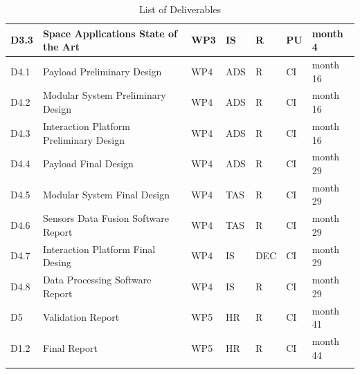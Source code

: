 \begin{longtable}[H]{p{1.8cm} >{\raggedright\arraybackslash}p{2.5cm} p{1.3cm} p{1.8cm} p{0.8cm} p{2.1cm} p{1.8cm}}
	D3.3 & Space Applications State of the Art & WP3 & IS & R  & PU  & month 4 \vspace{0.2cm} \\

	\midrule

 	D4.1 & Payload Preliminary Design  & WP4 & ADS & R & CI & month 16 \vspace{0.2cm} \\

 	\midrule

	D4.2 & Modular System Preliminary Design & WP4 & ADS & R & CI & month 16 \vspace{0.2cm} \\
	
	\midrule
	
	D4.3 & Interaction Platform Preliminary Design  & WP4 & ADS & R & CI & month 16 \vspace{0.2cm} \\

	\midrule

 	D4.4 & Payload Final Design & WP4 & ADS & R & CI & month 29  \vspace{0.2cm} \\

 	\midrule

	D4.5 & Modular System  Final Design & WP4 & TAS & R & CI & month 29  \vspace{0.2cm} \\
	
	\midrule
	
	D4.6 & Sensors Data Fusion Software Report  & WP4 & TAS & R & CI & month 29  \vspace{0.2cm} \\

	\midrule

 	D4.7 & Interaction Platform Final Desing  & WP4 & IS & DEC & CI & month 29 \vspace{0.2cm} \\

 	\midrule

	D4.8 & Data Processing Software Report & WP4 & IS & R & CI & month 29  \vspace{0.2cm} \\
	
	\midrule
	
	D5 & Validation Report & WP5 & HR & R & CI & month 41  \vspace{0.2cm} \\

	\midrule

 	D1.2 & Final Report & WP5 & HR & R & CI & month 44 \vspace{0.2cm} \\
	
	\bottomrule[2pt]
	
	\caption{List of Deliverables}
	\label{Deliverables}
\end{longtable}


